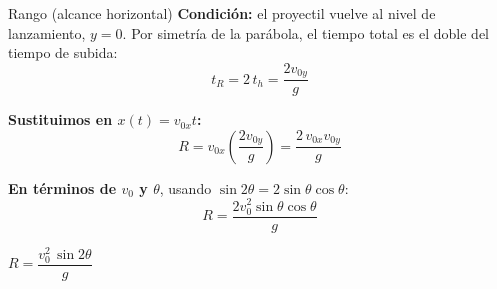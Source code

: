 \documentclass[aspectratio=169,xcolor=dvipsnames]{beamer}
\begin{document}
	\begin{frame}{Rango (alcance horizontal)}
		\small
		\textbf{Condición:} el proyectil vuelve al nivel de lanzamiento, $y = 0$.
		Por simetría de la parábola, el tiempo total es el doble del tiempo de subida:
		\[
		t_R = 2\,t_h = \frac{2v_{0y}}{g}
		\]
		
		\vspace{0.15cm}
		\textbf{Sustituimos en $x(t) = v_{0x}t$:}
		\[
		R = v_{0x}\left(\frac{2v_{0y}}{g}\right) = \frac{2\,v_{0x}v_{0y}}{g}
		\]
		
		\vspace{0.1cm}
		\textbf{En términos de $v_0$ y $\theta$}, usando $\sin 2\theta = 2\sin\theta\cos\theta$:
		\[
		R = \frac{2v_0^{2}\sin\theta\cos\theta}{g}
		\]
		
		\begin{exampleblock}{}
			\centering
			\Large $R = \dfrac{v_0^{2}\,\sin 2\theta}{g}$
		\end{exampleblock}
	\end{frame}
	
\end{document}
